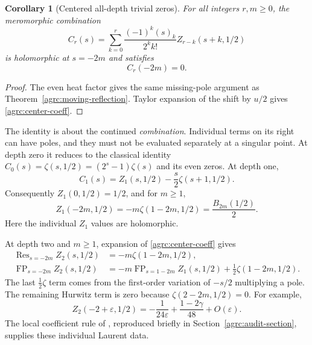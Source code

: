 \documentclass[11pt]{article}
\numberwithin{equation}{section}
\newtheorem{corollary}[theorem]{Corollary}
\theoremstyle{definition}\newtheorem{definition}[theorem]{Definition}
\theoremstyle{remark}\newtheorem{remark}[theorem]{Remark}
\newcommand{\FP}{\operatorname{FP}}
\newcommand{\Res}{\operatorname{Res}}
\begin{document}
\begin{corollary}[Centered all-depth trivial zeros]
\label{agrc:center-zeros}
For all integers $r,m\geq0$, the meromorphic combination
\begin{equation}\label{agrc:center-coeff}
 \boxed{\displaystyle
 C_r(s)=\sum_{k=0}^r\frac{(-1)^k(s)_k}{2^k k!}
                               Z_{r-k}(s+k,1/2)}
\end{equation}
is holomorphic at $s=-2m$ and satisfies
\begin{equation}\label{agrc:center-zero}
 \boxed{C_r(-2m)=0.}
\end{equation}
\end{corollary}
\begin{proof}
The even heat factor gives the same missing-pole argument as
Theorem~\ref{agrc:moving-reflection}. Taylor expansion of the shift by
$u/2$ gives \eqref{agrc:center-coeff}.
\end{proof}

The identity is about the continued \emph{combination}. Individual terms
on its right can have poles, and they must not be evaluated separately
at a singular point. At depth zero it reduces to the classical identity
$C_0(s)=\zeta(s,1/2)=(2^s-1)\zeta(s)$ and its even zeros.
At depth one,
\begin{equation}\label{agrc:C1}
 C_1(s)=Z_1(s,1/2)-\frac{s}{2}\zeta(s+1,1/2).
\end{equation}
Consequently $Z_1(0,1/2)=1/2$, and for $m\geq1$,
\begin{equation}\label{agrc:Z1-negative-even}
 Z_1(-2m,1/2)=-m\zeta(1-2m,1/2)=\frac{B_{2m}(1/2)}2.
\end{equation}
Here the individual $Z_1$ values are holomorphic.

At depth two and $m\geq1$, expansion of \eqref{agrc:center-coeff} gives
\begin{align}
 \Res_{s=-2m}Z_2(s,1/2)&=-m\zeta(1-2m,1/2),\label{agrc:Z2-residue}\\
 \FP_{s=-2m}Z_2(s,1/2)
 &=-m\FP_{s=1-2m}Z_1(s,1/2)
                         +\tfrac12\zeta(1-2m,1/2).
 \label{agrc:Z2-fp}
\end{align}
The last $\tfrac12\zeta$ term comes from the first-order variation of
$-s/2$ multiplying a pole. The remaining Hurwitz term is zero because
$\zeta(2-2m,1/2)=0$. For example,
\begin{equation}\label{agrc:Z2-example}
 Z_2(-2+\varepsilon,1/2)
      =-\frac1{24\varepsilon}+\frac{1-2\gamma}{48}+O(\varepsilon).
\end{equation}
The local coefficient rule of \cite{repo-laurent}, reproduced briefly in
Section~\ref{agrc:audit-section}, supplies these individual Laurent data.
\end{document}
